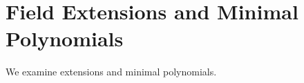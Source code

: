 \section{Field Extensions and Minimal Polynomials}
\label{sec:extensions-minimal}

We examine extensions and minimal polynomials.
